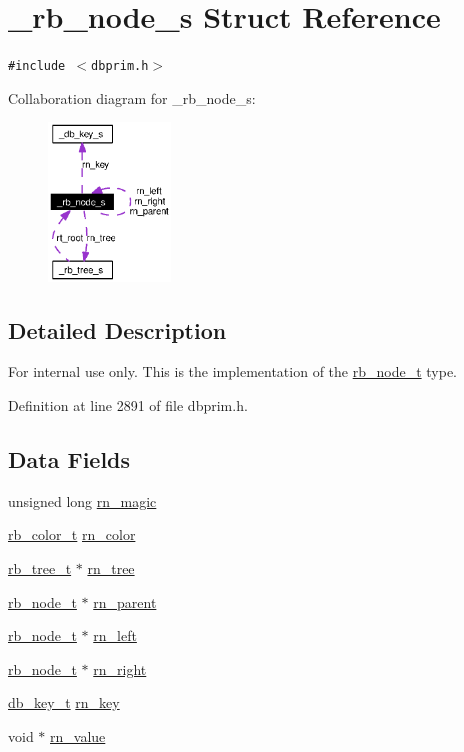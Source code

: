 \hypertarget{struct__rb__node__s}{
\section{\_\-rb\_\-node\_\-s Struct Reference}
\label{struct__rb__node__s}
}
{\tt \#include $<$dbprim.h$>$}

Collaboration diagram for \_\-rb\_\-node\_\-s:\begin{figure}[H]
\begin{center}
\leavevmode
\includegraphics[width=92pt]{struct__rb__node__s__coll__graph}
\end{center}
\end{figure}


\subsection{Detailed Description}
\begin{Desc}
\item[For internal use only.]
This is the implementation of the \hyperlink{group__dbprim__rbtree_ga1}{rb\_\-node\_\-t} type.\end{Desc}




Definition at line 2891 of file dbprim.h.\subsection*{Data Fields}
\begin{CompactItemize}
\item 
unsigned long \hyperlink{struct__rb__node__s_o0}{rn\_\-magic}
\item 
\hyperlink{group__dbprim__rbtree_ga4}{rb\_\-color\_\-t} \hyperlink{struct__rb__node__s_o1}{rn\_\-color}
\item 
\hyperlink{struct__rb__tree__s}{rb\_\-tree\_\-t} $\ast$ \hyperlink{struct__rb__node__s_o2}{rn\_\-tree}
\item 
\hyperlink{struct__rb__node__s}{rb\_\-node\_\-t} $\ast$ \hyperlink{struct__rb__node__s_o3}{rn\_\-parent}
\item 
\hyperlink{struct__rb__node__s}{rb\_\-node\_\-t} $\ast$ \hyperlink{struct__rb__node__s_o4}{rn\_\-left}
\item 
\hyperlink{struct__rb__node__s}{rb\_\-node\_\-t} $\ast$ \hyperlink{struct__rb__node__s_o5}{rn\_\-right}
\item 
\hyperlink{struct__db__key__s}{db\_\-key\_\-t} \hyperlink{struct__rb__node__s_o6}{rn\_\-key}
\item 
void $\ast$ \hyperlink{struct__rb__node__s_o7}{rn\_\-value}
\end{CompactItemize}


